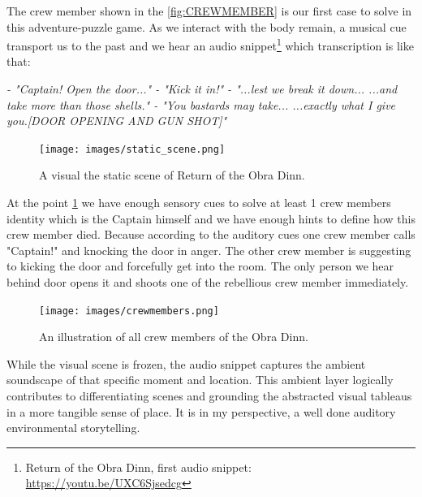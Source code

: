             The crew member shown in the \ref{fig:CREWMEMBER} is our first case to solve in this adventure-puzzle game. As we interact with the body remain, a musical cue transport us to the past and we hear an audio snippet\footnote{Return of the Obra Dinn, first audio snippet: \url{https://youtu.be/UXC6Sjsedcg}} which transcription is like that:\par
            \emph{
                \newline
                - "Captain! Open the door..."\newline
                - "Kick it in!"\newline
                - "...lest we break it down... ...and take more than those shells."\newline
                - "You bastards may take... ...exactly what I give you.[DOOR OPENING AND GUN SHOT]"\newline
                }

            \begin{figure}[H]
                \centering
                \texttt{[image: images/static\_scene.png]}
                \caption{A visual the static scene of Return of the Obra Dinn.}
                \label{fig:STATICSCENE}
            \end{figure}            

            At the point \ref{fig:STATICSCENE} we have enough sensory cues to solve at least 1 crew members identity which is the Captain himself and we have enough hints to define how this crew member died. Because according to the auditory cues one crew member calls "Captain!" and knocking the door in anger. The other crew member is suggesting to kicking the door and forcefully get into the room. The only person we hear behind door opens it and shoots one of the rebellious crew member immediately.\par

            \begin{figure}[H]
                \centering
                \texttt{[image: images/crewmembers.png]}
                \caption{An illustration of all crew members of the Obra Dinn.}
                \label{fig:SHIPCREW}
            \end{figure}   

            While the visual scene is frozen, the audio snippet captures the ambient soundscape of that specific moment and location. This ambient layer logically contributes to differentiating scenes and grounding the abstracted visual tableaus in a more tangible sense of place. It is in my perspective, a well done auditory environmental storytelling.\par           

